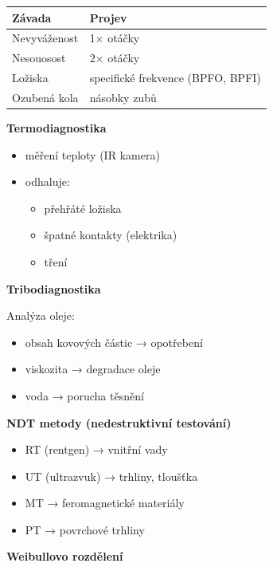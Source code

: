 \documentclass[a4paper,10pt]{article}
\begin{document}
\begin{vysvetlenibox}
\begin{center}
\begin{tabularx}{0.95\linewidth}{l X}
Závada & Projev \\
\hline
Nevyváženost & 1× otáčky \\
Nesouosost & 2× otáčky \\
Ložiska & specifické frekvence (BPFO, BPFI) \\
Ozubená kola & násobky zubů \\
\end{tabularx}
\end{center}

\textbf{Termodiagnostika}

\begin{itemize}
\item měření teploty (IR kamera)
\item odhaluje:
\begin{itemize}
\item přehřáté ložiska
\item špatné kontakty (elektrika)
\item tření
\end{itemize}
\end{itemize}

\textbf{Tribodiagnostika}

Analýza oleje:

\begin{itemize}
\item obsah kovových částic → opotřebení
\item viskozita → degradace oleje
\item voda → porucha těsnění
\end{itemize}

\textbf{NDT metody (nedestruktivní testování)}

\begin{itemize}
\item RT (rentgen) → vnitřní vady
\item UT (ultrazvuk) → trhliny, tloušťka
\item MT → feromagnetické materiály
\item PT → povrchové trhliny
\end{itemize}

\textbf{Weibullovo rozdělení}


\end{vysvetlenibox}
\end{document}
